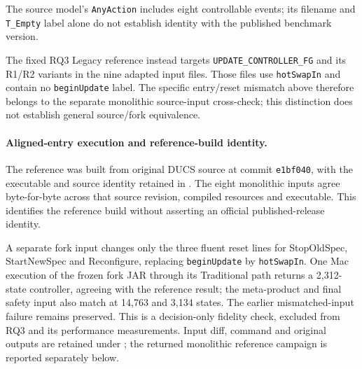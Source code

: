 \documentclass[11pt]{article}
\begin{document}
The source model's \texttt{AnyAction} includes eight controllable events; its filename and \texttt{T\_Empty} label alone do not establish identity with the published benchmark version.

The fixed RQ3 Legacy reference instead targets \texttt{UPDATE\_CONTROLLER\_FG} and its R1/R2 variants in the nine adapted input files. Those files use \texttt{hotSwapIn} and contain no \texttt{beginUpdate} label. The specific entry/reset mismatch above therefore belongs to the separate monolithic source-input cross-check; this distinction does not establish general source/fork equivalence.

\paragraph{Aligned-entry execution and reference-build identity.}
The reference was built from original DUCS source at commit \texttt{e1bf040}, with the executable and source identity retained in . The eight monolithic inputs agree byte-for-byte across that source revision, compiled resources and executable. This identifies the reference build without asserting an official published-release identity.

A separate fork input changes only the three fluent reset lines for StopOldSpec, StartNewSpec and Reconfigure, replacing \texttt{beginUpdate} by \texttt{hotSwapIn}. One Mac execution of the frozen fork JAR through its Traditional path returns a 2,312-state controller, agreeing with the reference result; the meta-product and final safety input also match at 14,763 and 3,134 states. The earlier mismatched-input failure remains preserved. This is a decision-only fidelity check, excluded from RQ3 and its performance measurements. Input diff, command and original outputs are retained under ; the returned monolithic reference campaign is reported separately below.
\end{document}
